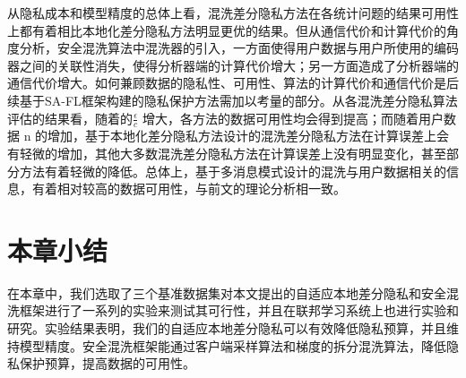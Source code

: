 从隐私成本和模型精度的总体上看，混洗差分隐私方法在各统计问题的结果可用性上都有着相比本地化差分隐私方法明显更优的结果。但从通信代价和计算代价的角度分析，安全混洗算法中混洗器的引入，一方面使得用户数据与用户所使用的编码器之间的关联性消失，使得分析器端的计算代价增大；另一方面造成了分析器端的通信代价增大。如何兼顾数据的隐私性、可用性、算法的计算代价和通信代价是后续基于SA-FL框架构建的隐私保护方法需加以考量的部分。从各混洗差分隐私算法评估的结果看，随着的$\frac{\epsilon}{c}$
增大，各方法的数据可用性均会得到提高；而随着用户数据 n 的增加，基于本地化差分隐私方法设计的混洗差分隐私方法在计算误差上会有轻微的增加，其他大多数混洗差分隐私方法在计算误差上没有明显变化，甚至部分方法有着轻微的降低。总体上，基于多消息模式设计的混洗与用户数据相关的信息，有着相对较高的数据可用性，与前文的理论分析相一致。


\section{本章小结}
在本章中，我们选取了三个基准数据集对本文提出的自适应本地差分隐私和安全混洗框架进行了一系列的实验来测试其可行性，并且在联邦学习系统上也进行实验和研究。实验结果表明，我们的自适应本地差分隐私可以有效降低隐私预算，并且维持模型精度。安全混洗框架能通过客户端采样算法和梯度的拆分混洗算法，降低隐私保护预算，提高数据的可用性。

